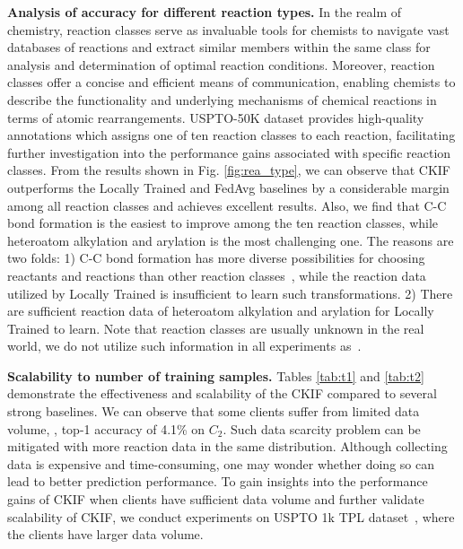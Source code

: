 \noindent\textbf{Analysis of accuracy for different reaction types.} 
In the realm of chemistry, reaction classes serve as invaluable tools for chemists to navigate vast databases of reactions and extract similar members within the same class for analysis and determination of optimal reaction conditions. Moreover, reaction classes offer a concise and efficient means of communication, enabling chemists to describe the functionality and underlying mechanisms of chemical reactions in terms of atomic rearrangements. USPTO-50K dataset provides high-quality annotations which assigns one of ten reaction classes to each reaction, facilitating further investigation into the performance gains associated with specific reaction classes. From the results shown in Fig. \ref{fig:rea_type}, we can observe that CKIF outperforms the Locally Trained and FedAvg baselines by a considerable margin among all reaction classes and achieves excellent results. Also, we find that C-C bond formation is the easiest to improve among the ten reaction classes, while heteroatom alkylation and arylation is the most challenging one. The reasons are two folds: 1) C-C bond formation has more diverse possibilities for choosing reactants and reactions than other reaction classes~\citep{tetko2020state}, while the reaction data utilized by Locally Trained is insufficient to learn such transformations. 2) There are sufficient reaction data of heteroatom alkylation and arylation for Locally Trained to learn. Note that reaction classes are usually unknown in the real world, we do not utilize such information in all experiments as~\citep{zhong2022root}.



\noindent\textbf{Scalability to number of training samples.} 
Tables \ref{tab:t1} and \ref{tab:t2} demonstrate the effectiveness and scalability of the CKIF compared to several strong baselines. We can observe that some clients suffer from limited data volume, \eg, top-1 accuracy of 4.1\% on $C_2$. Such data scarcity problem can be mitigated with more reaction data in the same distribution. Although collecting data is expensive and time-consuming, one may wonder whether doing so can lead to better prediction performance. To gain insights into the performance gains of CKIF when clients have sufficient data volume and further validate scalability of CKIF, we conduct experiments on USPTO 1k TPL dataset~\citep{schwaller2021mapping}, where the clients have larger data volume. 

